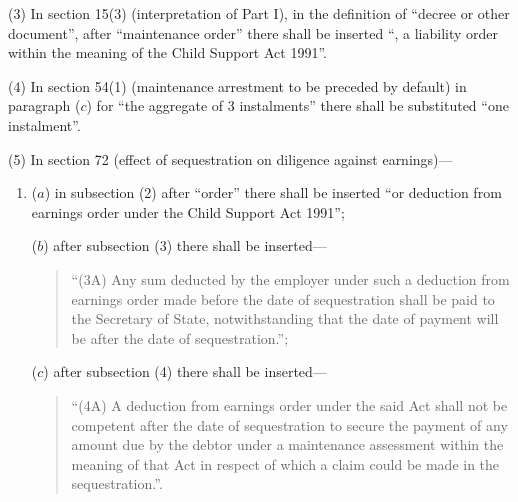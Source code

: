 \documentclass[a4paper]{article}
\begin{document}
(3) In section 15(3) (interpretation of Part I), in the definition of “decree or other document”, after “maintenance order” there shall be inserted “, a liability order within the meaning of the Child Support Act 1991”.

(4) In section 54(1) (maintenance arrestment to be preceded by default) in paragraph ($c$) for “the aggregate of 3 instalments” there shall be substituted “one instalment”.

(5) In section 72 (effect of sequestration on diligence against earnings)---
\begin{enumerate}\item[]
($a$) in subsection (2) after “order” there shall be inserted “or deduction from earnings order under the Child Support Act 1991”;

($b$) after subsection (3) there shall be inserted---
\begin{quotation}
“(3A) Any sum deducted by the employer under such a deduction from earnings order made before the date of sequestration shall be paid to the Secretary of State, notwithstanding that the date of payment will be after the date of sequestration.”;
\end{quotation}

($c$) after subsection (4) there shall be inserted—
\begin{quotation}
“(4A) A deduction from earnings order under the said Act shall not be competent after the date of sequestration to secure the payment of any amount due by the debtor under a maintenance assessment within the meaning of that Act in respect of which a claim could be made in the sequestration.”.
\end{quotation}
\end{enumerate}
\end{document}

